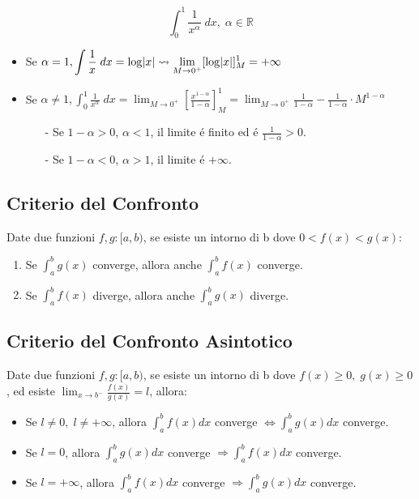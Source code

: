 \documentclass{article}
\begin{document}
\begin{equation*}
    \int_{0}^1 \frac{1}{x^\alpha} \; dx, \; \alpha \in \mathbb{R}
\end{equation*}

\begin{itemize}
    \item Se $\displaystyle \alpha = 1, \int \frac{1}{x} \; dx = \log{\abs{x}} \rightsquigarrow \lim_{M \to 0^+} [\log{\abs{x}}]_{M}^1 = + \infty$
    \item Se $\displaystyle \alpha \neq 1, \int_{0}^1 \frac{1}{x^\alpha} \; dx = \lim_{M \to 0^+} [\frac{x^{1-\alpha}}{1 - \alpha}]_{M}^1 =  \lim_{M \to 0^+} \frac{1}{1 - \alpha} - \frac{1}{1 - \alpha} \cdot M^{1 - \alpha}$
        \begin{itemize}
            \item[-] Se $1 -\alpha > 0$, $\alpha < 1$, il limite é finito ed é $\frac{1}{1 - \alpha} > 0$.
            \item[-] Se $1 -\alpha < 0$, $\alpha > 1$, il limite é $+ \infty$. 
        \end{itemize}
\end{itemize}

\subsection{Criterio del Confronto}

Date due funzioni $f,g: [a, b)$, se esiste un intorno di b dove $0<f(x)<g(x)$:

\begin{enumerate}
    \item Se $\int_{a}^b g(x)$ converge, allora anche $\int_{a}^b f(x)$ converge.
    \item Se $\int_{a}^b f(x)$ diverge, allora anche $\int_{a}^b g(x)$ diverge. 
\end{enumerate}

\subsection{Criterio del Confronto Asintotico}

Date due funzioni $f,g: [a, b)$, se esiste un intorno di b dove $f(x) \geq 0, \; g(x) \geq 0$, ed esiste $\displaystyle \lim_{x \to b^-} \frac{f(x)}{g(x)} = l$, allora:

\begin{itemize}
    \item Se $l \neq 0, \; l \neq + \infty$, allora $\int_{a}^b f(x) dx$ converge $\Leftrightarrow \int_{a}^b g(x) dx$ converge.
    \item Se $l = 0$, allora $\int_{a}^b g(x) dx$ converge $\Rightarrow \int_{a}^b f(x) dx$ converge.
    \item Se $l = + \infty$, allora $\int_{a}^b f(x) dx$ converge $\Rightarrow \int_{a}^b g(x) dx$ converge.
\end{itemize}
\end{document}

